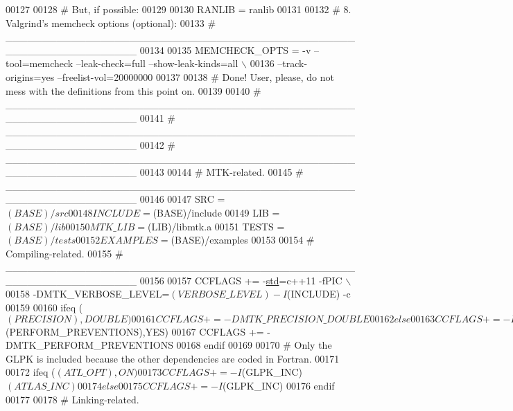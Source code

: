 \begin{DoxyCode}
00127 \textcolor{stringliteral}{}
00128 \textcolor{stringliteral}{# But, if possible:}
00129 \textcolor{stringliteral}{}
00130 \textcolor{stringliteral}{RANLIB = ranlib}
00131 \textcolor{stringliteral}{}
00132 \textcolor{stringliteral}{#   8. Valgrind'}s memcheck options (optional):
00133 \textcolor{preprocessor}{#   \_\_\_\_\_\_\_\_\_\_\_\_\_\_\_\_\_\_\_\_\_\_\_\_\_\_\_\_\_\_\_\_\_\_\_\_\_\_\_\_\_\_\_\_\_\_\_\_\_\_\_\_\_\_\_\_\_\_\_\_\_\_\_\_\_\_}
00134 
00135 MEMCHECK\_OPTS = -v --tool=memcheck --leak-check=full --show-leak-kinds=all \(\backslash\)
00136   --track-origins=yes --freelist-vol=20000000
00137 
00138 \textcolor{preprocessor}{# Done! User, please, do not mess with the definitions from this point on.}
00139 
00140 \textcolor{preprocessor}{#   \_\_\_\_\_\_\_\_\_\_\_\_\_\_\_\_\_\_\_\_\_\_\_\_\_\_\_\_\_\_\_\_\_\_\_\_\_\_\_\_\_\_\_\_\_\_\_\_\_\_\_\_\_\_\_\_\_\_\_\_\_\_\_\_\_\_}
00141 \textcolor{preprocessor}{#   \_\_\_\_\_\_\_\_\_\_\_\_\_\_\_\_\_\_\_\_\_\_\_\_\_\_\_\_\_\_\_\_\_\_\_\_\_\_\_\_\_\_\_\_\_\_\_\_\_\_\_\_\_\_\_\_\_\_\_\_\_\_\_\_\_\_}
00142 \textcolor{preprocessor}{#   \_\_\_\_\_\_\_\_\_\_\_\_\_\_\_\_\_\_\_\_\_\_\_\_\_\_\_\_\_\_\_\_\_\_\_\_\_\_\_\_\_\_\_\_\_\_\_\_\_\_\_\_\_\_\_\_\_\_\_\_\_\_\_\_\_\_}
00143 
00144 \textcolor{preprocessor}{#   MTK-related.}
00145 \textcolor{preprocessor}{#   \_\_\_\_\_\_\_\_\_\_\_\_\_\_\_\_\_\_\_\_\_\_\_\_\_\_\_\_\_\_\_\_\_\_\_\_\_\_\_\_\_\_\_\_\_\_\_\_\_\_\_\_\_\_\_\_\_\_\_\_\_\_\_\_\_\_}
00146 
00147 SRC       = $(BASE)/src
00148 INCLUDE   = $(BASE)/include
00149 LIB       = $(BASE)/lib
00150 MTK\_LIB   = $(LIB)/libmtk.a
00151 TESTS     = $(BASE)/tests
00152 EXAMPLES  = $(BASE)/examples
00153 
00154 \textcolor{preprocessor}{#   Compiling-related.}
00155 \textcolor{preprocessor}{#   \_\_\_\_\_\_\_\_\_\_\_\_\_\_\_\_\_\_\_\_\_\_\_\_\_\_\_\_\_\_\_\_\_\_\_\_\_\_\_\_\_\_\_\_\_\_\_\_\_\_\_\_\_\_\_\_\_\_\_\_\_\_\_\_\_\_}
00156 
00157 CCFLAGS += -\hyperlink{namespacestd}{std}=c++11 -fPIC \(\backslash\)
00158   -DMTK\_VERBOSE\_LEVEL=$(VERBOSE\_LEVEL) -I$(INCLUDE) -c
00159 
00160 ifeq ($(PRECISION),DOUBLE)
00161   CCFLAGS += -DMTK\_PRECISION\_DOUBLE
00162 else
00163   CCFLAGS += -DMTK\_PRECISION\_SINGLE
00164 endif
00165 
00166 ifeq ($(PERFORM\_PREVENTIONS),YES)
00167   CCFLAGS += -DMTK\_PERFORM\_PREVENTIONS
00168 endif
00169 
00170 \textcolor{preprocessor}{# Only the GLPK is included because the other dependencies are coded in Fortran.}
00171 
00172 ifeq ($(ATL\_OPT),ON)
00173   CCFLAGS  += -I$(GLPK\_INC) $(ATLAS\_INC)
00174 else
00175   CCFLAGS  += -I$(GLPK\_INC)
00176 endif
00177 
00178 \textcolor{preprocessor}{#   Linking-related.}

\end{DoxyCode}
